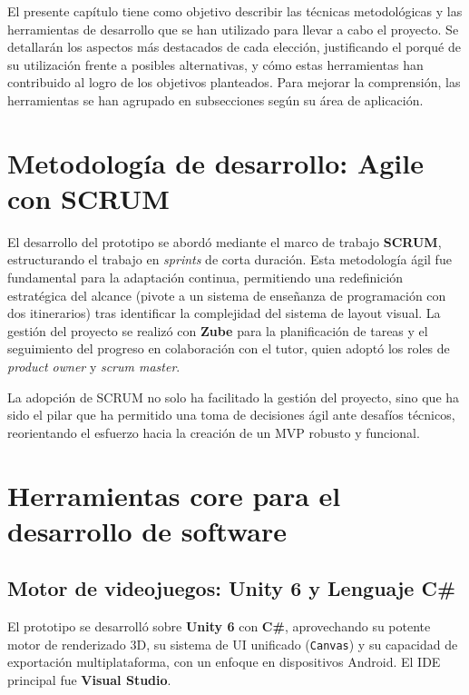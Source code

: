 
El presente capítulo tiene como objetivo describir las técnicas metodológicas y las herramientas de desarrollo que se han utilizado para llevar a cabo el proyecto. Se detallarán los aspectos más destacados de cada elección, justificando el porqué de su utilización frente a posibles alternativas, y cómo estas herramientas han contribuido al logro de los objetivos planteados. Para mejorar la comprensión, las herramientas se han agrupado en subsecciones según su área de aplicación.

\section{Metodología de desarrollo: Agile con SCRUM}
El desarrollo del prototipo se abordó mediante el marco de trabajo \textbf{SCRUM}, estructurando el trabajo en \textit{sprints} de corta duración. Esta metodología ágil fue fundamental para la adaptación continua, permitiendo una redefinición estratégica del alcance (pivote a un sistema de enseñanza de programación con dos itinerarios) tras identificar la complejidad del sistema de layout visual. La gestión del proyecto se realizó con \textbf{Zube} \cite{ZubePlatform} para la planificación de tareas y el seguimiento del progreso en colaboración con el tutor, quien adoptó los roles de \textit{product owner} y \textit{scrum master}.



La adopción de SCRUM no solo ha facilitado la gestión del proyecto, sino que ha sido el pilar que ha permitido una toma de decisiones ágil ante desafíos técnicos, reorientando el esfuerzo hacia la creación de un MVP robusto y funcional.

\section{Herramientas core para el desarrollo de software}

\subsection{Motor de videojuegos: Unity 6 y Lenguaje C\#}
El prototipo se desarrolló sobre \textbf{Unity 6} con \textbf{C\#}, aprovechando su potente motor de renderizado 3D, su sistema de UI unificado (\texttt{Canvas}) y su capacidad de exportación multiplataforma, con un enfoque en dispositivos Android. El IDE principal fue \textbf{Visual Studio}.

